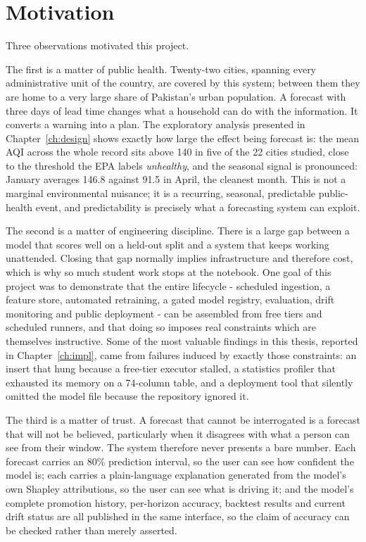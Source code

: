 \section{Motivation}
Three observations motivated this project.

The first is a matter of public health. Twenty-two cities, spanning every
administrative unit of the country, are covered by this system; between them they
are home to a very large share of Pakistan's urban population. A forecast with
three days of lead time changes what a household can do with the information. It
converts a warning into a plan. The exploratory analysis presented in
Chapter~\ref{ch:design} shows exactly how large the effect being forecast is: the
mean AQI across the whole record sits above 140 in five of the 22 cities
studied, close to the threshold the EPA labels \emph{unhealthy}, and the
seasonal signal is pronounced: January averages 146.8 against 91.5 in April,
the cleanest month. This is not a marginal environmental nuisance; it is a recurring, seasonal,
predictable public-health event, and predictability is precisely what a
forecasting system can exploit.

The second is a matter of engineering discipline. There is a large gap between a
model that scores well on a held-out split and a system that keeps working
unattended. Closing that gap normally implies infrastructure and therefore cost,
which is why so much student work stops at the notebook. One goal of this project
was to demonstrate that the entire lifecycle - scheduled ingestion, a feature
store, automated retraining, a gated model registry, evaluation, drift monitoring
and public deployment - can be assembled from free tiers and scheduled runners,
and that doing so imposes real constraints which are themselves instructive. Some
of the most valuable findings in this thesis, reported in
Chapter~\ref{ch:impl}, came from failures induced by exactly those constraints:
an insert that hung because a free-tier executor stalled, a statistics profiler
that exhausted its memory on a 74-column table, and a deployment tool that
silently omitted the model file because the repository ignored it.

The third is a matter of trust. A forecast that cannot be interrogated is a
forecast that will not be believed, particularly when it disagrees with what a
person can see from their window. The system therefore never presents a bare
number. Each forecast carries an 80\% prediction interval, so the user can see
how confident the model is; each carries a plain-language explanation generated
from the model's own Shapley attributions, so the user can see what is driving
it; and the model's complete promotion history, per-horizon accuracy, backtest
results and current drift status are all published in the same interface, so the
claim of accuracy can be checked rather than merely asserted.

